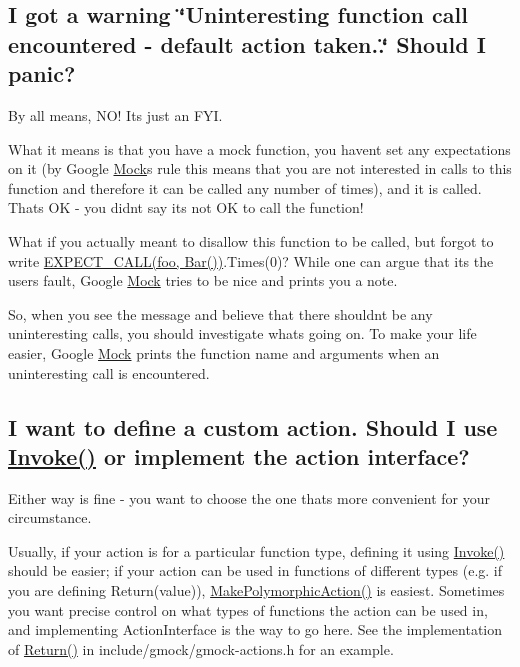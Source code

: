 \subsection*{I got a warning \char`\"{}\+Uninteresting function call encountered -\/ default action taken..\char`\"{} Should I panic?}

By all means, N\+O! It\textquotesingle{}s just an F\+YI.

What it means is that you have a mock function, you haven\textquotesingle{}t set any expectations on it (by Google \hyperlink{class_mock}{Mock}\textquotesingle{}s rule this means that you are not interested in calls to this function and therefore it can be called any number of times), and it is called. That\textquotesingle{}s OK -\/ you didn\textquotesingle{}t say it\textquotesingle{}s not OK to call the function!

What if you actually meant to disallow this function to be called, but forgot to write {\ttfamily \hyperlink{gmock-spec-builders_8h_a535a6156de72c1a2e25a127e38ee5232}{E\+X\+P\+E\+C\+T\+\_\+\+C\+A\+L\+L(foo, Bar())}.Times(0)}? While one can argue that it\textquotesingle{}s the user\textquotesingle{}s fault, Google \hyperlink{class_mock}{Mock} tries to be nice and prints you a note.

So, when you see the message and believe that there shouldn\textquotesingle{}t be any uninteresting calls, you should investigate what\textquotesingle{}s going on. To make your life easier, Google \hyperlink{class_mock}{Mock} prints the function name and arguments when an uninteresting call is encountered.

\subsection*{I want to define a custom action. Should I use \hyperlink{namespacetesting_a12aebaf8363d49a383047529f798b694}{Invoke()} or implement the action interface?}

Either way is fine -\/ you want to choose the one that\textquotesingle{}s more convenient for your circumstance.

Usually, if your action is for a particular function type, defining it using {\ttfamily \hyperlink{namespacetesting_a12aebaf8363d49a383047529f798b694}{Invoke()}} should be easier; if your action can be used in functions of different types (e.\+g. if you are defining {\ttfamily Return(value)}), {\ttfamily \hyperlink{namespacetesting_a36bd06c5ea972c6df0bd9f40a7a94c65}{Make\+Polymorphic\+Action()}} is easiest. Sometimes you want precise control on what types of functions the action can be used in, and implementing {\ttfamily Action\+Interface} is the way to go here. See the implementation of {\ttfamily \hyperlink{namespacetesting_af6d1c13e9376c77671e37545cd84359c}{Return()}} in {\ttfamily include/gmock/gmock-\/actions.\+h} for an example.


